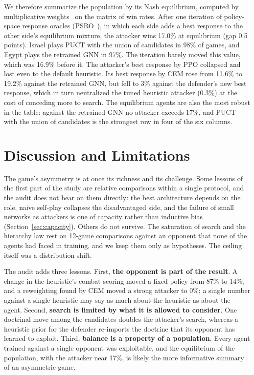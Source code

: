 \documentclass{article}
\begin{document}
We therefore summarize the population by its Nash equilibrium, computed by
multiplicative weights~\cite{mw} on the matrix of win rates. After one iteration of
policy-space response oracles (PSRO~\cite{psro}), in which each side adds a best
response to the other side's equilibrium mixture, the attacker wins 17.0\% at equilibrium
(gap 0.5 points). Israel plays PUCT with the union of candidates in 98\% of games, and
Egypt plays the retrained GNN in 97\%. The iteration barely moved this value, which was
16.9\% before it. The attacker's best response by PPO collapsed and lost even to the
default heuristic. Its best response by CEM rose from 11.6\% to 19.2\% against the
retrained GNN, but fell to 3\% against the defender's new best response, which in turn
neutralized the tuned heuristic attacker (0.3\%) at the cost of conceding more to search.
The equilibrium agents are also the most robust in the table: against the retrained GNN
no attacker exceeds 17\%, and PUCT with the union of candidates is the strongest row in
four of the six columns.

\section{Discussion and Limitations}
The game's asymmetry is at once its richness and its challenge. Some lessons of the
first part of the study are relative comparisons within a single protocol, and the audit
does not bear on them directly: the best architecture depends on the role, naive
self-play collapses the disadvantaged side, and the failure of small networks as attackers
is one of capacity rather than inductive bias (Section~\ref{sec:capacity}). Others do not
survive. The saturation of search and the hierarchy law rest on 12-game comparisons
against an opponent that none of the agents had faced in training, and we keep them only
as hypotheses. The ceiling itself was a distribution shift.

The audit adds three lessons. First, \textbf{the opponent is part of the result}. A
change in the heuristic's combat scoring moved a fixed policy from 87\% to 14\%, and a
reweighting found by CEM moved a strong attacker to 0\%; a single number against a single
heuristic may say as much about the heuristic as about the agent. Second, \textbf{search
is limited by what it is allowed to consider}. One doctrinal move among the candidates
doubles the attacker's search, whereas a heuristic prior for the defender re-imports the
doctrine that its opponent has learned to exploit. Third, \textbf{balance is a property
of a population}. Every agent trained against a single opponent was exploitable, and the
equilibrium of the population, with the attacker near 17\%, is likely the more
informative summary of an asymmetric game.
\end{document}
